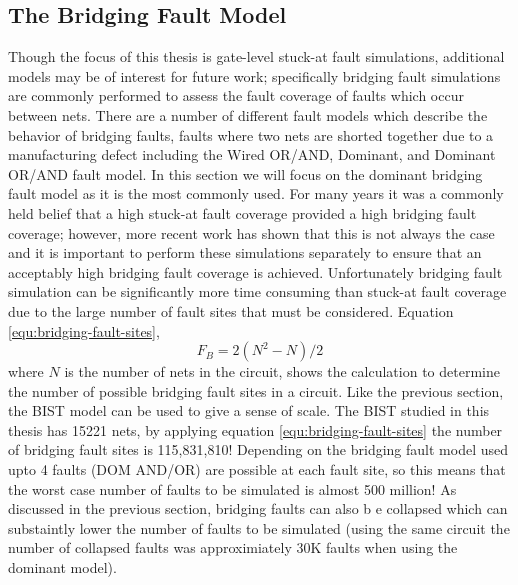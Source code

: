 \documentclass[12pt]{report}
\begin{document}
\subsection{The Bridging Fault Model}
\label{sct:bridgingfaults}
Though the focus of this thesis is gate-level stuck-at fault simulations, additional models may be of interest for future work; specifically bridging fault simulations are commonly performed to assess the fault coverage of faults which occur between nets.  There are a number of different fault models which describe the behavior of bridging faults, faults where two nets are shorted together due to a manufacturing defect including the Wired OR/AND, Dominant, and Dominant OR/AND fault model\cite{needed-bridging}.  In this section we will focus on the dominant bridging fault model as it is the most commonly used\cite{needed-bridging}.  For many years it was a commonly held belief that a high stuck-at fault coverage provided a high bridging fault coverage\cite{needed-bridging-faultcvg}; however, more recent work has shown that this is not always the case and it is important to perform these simulations separately to ensure that an acceptably high bridging fault coverage is achieved\cite{needed-bridging-newfaultcvg}.  Unfortunately bridging fault simulation can be significantly more time consuming than stuck-at fault coverage due to the large number of fault sites that must be considered.  Equation \ref{equ:bridging-fault-sites}, 
\begin{equation}
F_B = 2(N^2-N)/2
\end{equation}
where $N$ is the number of nets in the circuit, shows the calculation to determine the number of possible bridging fault sites in a circuit.  Like the previous section, the BIST model can be used to give a sense of scale.  The BIST studied in this thesis has 15221 nets, by applying equation \ref{equ:bridging-fault-sites} the number of bridging fault sites is 115,831,810!  Depending on the bridging fault model used upto 4 faults (DOM AND/OR) are possible at each fault site, so this means that the worst case number of faults to be simulated is almost 500 million!  As discussed in the previous section, bridging faults can also b e collapsed which can substaintly lower the number of faults to be simulated (using the same circuit the number of collapsed faults was approximiately 30K faults when using the dominant model).
\end{document}
